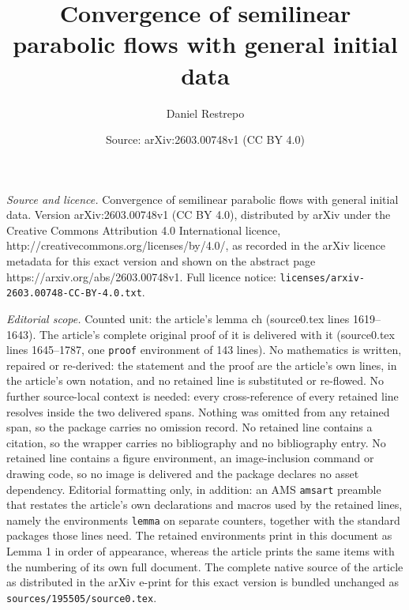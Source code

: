 \documentclass[10pt,a4paper]{amsart}
\title{Convergence of semilinear parabolic flows with general initial data}
\author{Daniel Restrepo}
\date{Source: arXiv:2603.00748v1 (CC BY 4.0)}
\begin{document}
\maketitle

\noindent\emph{Source and licence.} Convergence of semilinear parabolic flows with general initial data. Version arXiv:2603.00748v1 (CC BY 4.0), distributed by arXiv under the Creative Commons Attribution 4.0 International licence, http://creativecommons.org/licenses/by/4.0/, as recorded in the arXiv licence metadata for this exact version and shown on the abstract page https://arxiv.org/abs/2603.00748v1. Full licence notice: \texttt{licenses/arxiv-2603.00748-CC-BY-4.0.txt}.\par\smallskip

\noindent\textit{Editorial scope.} Counted unit: the article's lemma ch (source0.tex lines 1619--1643). The article's complete original proof of it is delivered with it (source0.tex lines 1645--1787, one \texttt{proof} environment of 143 lines). No mathematics is written, repaired or re-derived: the statement and the proof are the article's own lines, in the article's own notation, and no retained line is substituted or re-flowed.  No further source-local context is needed: every cross-reference of every retained line resolves inside the two delivered spans.  Nothing was omitted from any retained span, so the package carries no omission record.  No retained line contains a citation, so the wrapper carries no bibliography and no bibliography entry.  No retained line contains a figure environment, an image-inclusion command or drawing code, so no image is delivered and the package declares no asset dependency.  Editorial formatting only, in addition: an AMS \texttt{amsart} preamble that restates the article's own declarations and macros used by the retained lines, namely the environments \texttt{lemma} on separate counters, together with the standard packages those lines need.  The retained environments print in this document as Lemma 1 in order of appearance, whereas the article prints the same items with the numbering of its own full document.  The complete native source of the article as distributed in the arXiv e-print for this exact version is bundled unchanged as \texttt{sources/195505/source0.tex}.
\end{document}
